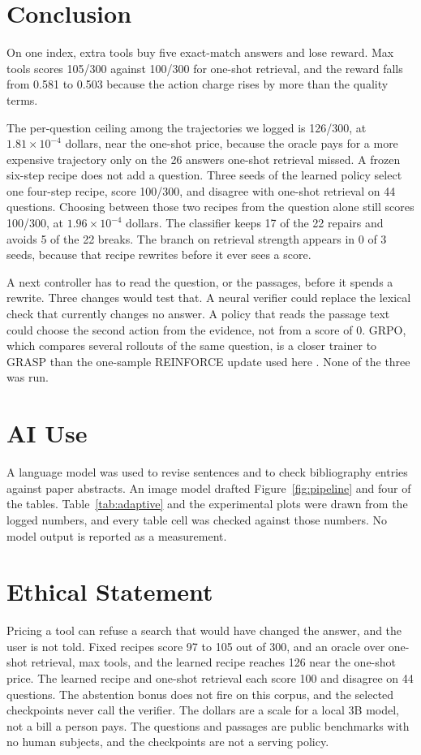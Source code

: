 \documentclass[letterpaper]{article} %
\begin{document}
\section{Conclusion}
On one index, extra tools buy five exact-match answers and lose reward. Max tools scores 105/300 against 100/300 for one-shot retrieval, and the reward falls from 0.581 to 0.503 because the action charge rises by more than the quality terms.

The per-question ceiling among the trajectories we logged is 126/300, at \(1.81\times 10^{-4}\) dollars, near the one-shot price, because the oracle pays for a more expensive trajectory only on the 26 answers one-shot retrieval missed. A frozen six-step recipe does not add a question. Three seeds of the learned policy select one four-step recipe, score 100/300, and disagree with one-shot retrieval on 44 questions. Choosing between those two recipes from the question alone still scores 100/300, at \(1.96\times 10^{-4}\) dollars. The classifier keeps 17 of the 22 repairs and avoids 5 of the 22 breaks. The branch on retrieval strength appears in 0 of 3 seeds, because that recipe rewrites before it ever sees a score.

A next controller has to read the question, or the passages, before it spends a rewrite. Three changes would test that. A neural verifier could replace the lexical check that currently changes no answer. A policy that reads the passage text could choose the second action from the evidence, not from a score of 0. GRPO, which compares several rollouts of the same question, is a closer trainer to GRASP than the one-sample REINFORCE update used here \cite{shao2024deepseekmath,gandhi2026grasp}. None of the three was run.

\section*{AI Use}
A language model was used to revise sentences and to check bibliography entries against paper abstracts. An image model drafted Figure~\ref{fig:pipeline} and four of the tables. Table~\ref{tab:adaptive} and the experimental plots were drawn from the logged numbers, and every table cell was checked against those numbers. No model output is reported as a measurement.

\section*{Ethical Statement}
Pricing a tool can refuse a search that would have changed the answer, and the user is not told. Fixed recipes score 97 to 105 out of 300, and an oracle over one-shot retrieval, max tools, and the learned recipe reaches 126 near the one-shot price. The learned recipe and one-shot retrieval each score 100 and disagree on 44 questions. The abstention bonus does not fire on this corpus, and the selected checkpoints never call the verifier. The dollars are a scale for a local 3B model, not a bill a person pays. The questions and passages are public benchmarks with no human subjects, and the checkpoints are not a serving policy.

\FloatBarrier
\begingroup
\raggedright
\setlength{\bibhang}{1em}
\setlength{\bibsep}{3pt}
\raggedbottom
{}
\endgroup
\end{document}
